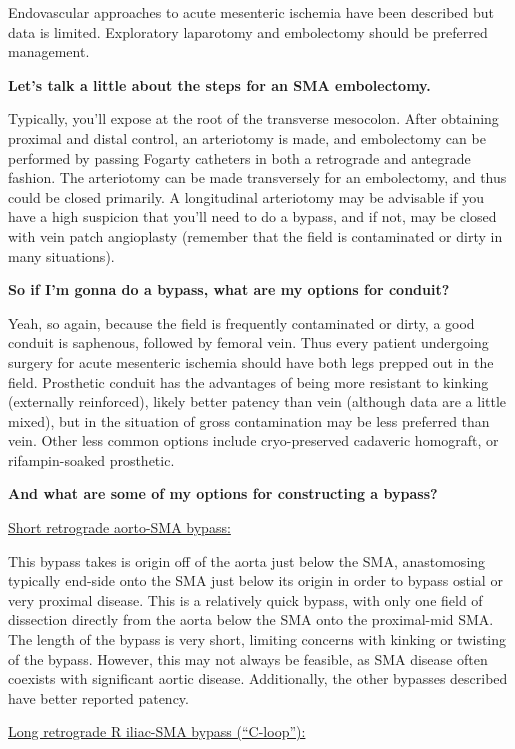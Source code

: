 \documentclass[
]{book}
\begin{document}
Endovascular approaches to acute mesenteric ischemia have been described
but data is limited. Exploratory laparotomy and embolectomy should be
preferred management.\citep{wyersmarkcandmartin2019}

\textbf{Let's talk a little about the steps for an SMA embolectomy.}

Typically, you'll expose at the root of the transverse mesocolon. After
obtaining proximal and distal control, an arteriotomy is made, and
embolectomy can be performed by passing Fogarty catheters in both a
retrograde and antegrade fashion. The arteriotomy can be made
transversely for an embolectomy, and thus could be closed primarily. A
longitudinal arteriotomy may be advisable if you have a high suspicion
that you'll need to do a bypass, and if not, may be closed with vein
patch angioplasty (remember that the field is contaminated or dirty in
many situations).

\textbf{So if I'm gonna do a bypass, what are my options for conduit?}

Yeah, so again, because the field is frequently contaminated or dirty, a
good conduit is saphenous, followed by femoral vein. Thus every patient
undergoing surgery for acute mesenteric ischemia should have both legs
prepped out in the field. Prosthetic conduit has the advantages of being
more resistant to kinking (externally reinforced), likely better patency
than vein (although data are a little mixed), but in the situation of
gross contamination may be less preferred than vein. Other less common
options include cryo-preserved cadaveric homograft, or rifampin-soaked
prosthetic.

\textbf{And what are some of my options for constructing a bypass?}

\uline{Short retrograde aorto-SMA bypass:}

This bypass takes is origin off of the aorta just below the SMA,
anastomosing typically end-side onto the SMA just below its origin in
order to bypass ostial or very proximal disease. This is a relatively
quick bypass, with only one field of dissection directly from the aorta
below the SMA onto the proximal-mid SMA. The length of the bypass is
very short, limiting concerns with kinking or twisting of the bypass.
However, this may not always be feasible, as SMA disease often coexists
with significant aortic disease. Additionally, the other bypasses
described have better reported patency.

\uline{Long retrograde R iliac-SMA bypass (``C-loop''):}
\end{document}
